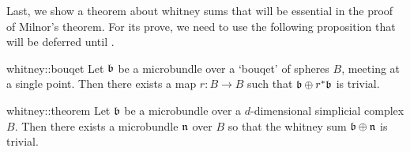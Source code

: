 \begin{myparagraph}
    Last, we show a theorem about whitney sums that will be
    essential in the proof of Milnor's theorem.
    For its prove, we need to use the following proposition
    that will be deferred until .
\end{myparagraph}

\begin{myproposition}{whitney::bouqet}{}
    Let $\mathfrak{b}$ be a microbundle over a `bouqet' of spheres $B$, meeting at a single point.
    Then there exists a map $r: B \to B$ such that $\mathfrak{b} \oplus{} r^*\mathfrak{b}$ is trivial.
\end{myproposition}

\begin{mytheorem}{whitney::theorem}{}
    Let $\mathfrak{b}$ be a microbundle over a $d$-dimensional simplicial complex $B$.
    Then there exists a microbundle $\mathfrak{n}$ over $B$ so that the whitney sum $\mathfrak{b} \oplus{} \mathfrak{n}$ is trivial.
\end{mytheorem}

